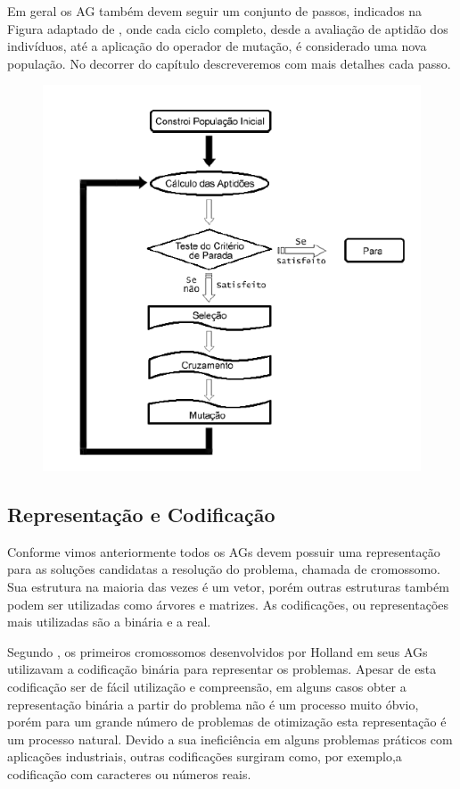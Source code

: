 	

Em geral os AG também devem seguir um conjunto de passos, indicados na Figura adaptado de \cite{kondageski08}, onde cada ciclo completo, desde a avaliação de aptidão dos indivíduos, até a aplicação do operador de mutação, é considerado uma nova população. No decorrer do capítulo descreveremos com mais detalhes cada passo.

\begin{figure}[ht!]
	\centering
	\includegraphics[scale=0.8]{figuras/processo-evolutivo.PNG}
	\label{processo-evolutivo}
\end{figure}

\subsection{Representação e Codificação}
 
 
Conforme vimos anteriormente todos os AGs devem possuir uma representação para as soluções candidatas a resolução do problema, chamada de cromossomo. Sua estrutura na maioria das vezes é um vetor, porém outras estruturas também podem ser utilizadas como árvores e matrizes. As codificações, ou representações mais utilizadas são a binária e a real.



Segundo \cite{linden12}, os primeiros cromossomos desenvolvidos por Holland em seus AGs utilizavam a codificação binária para representar os problemas. Apesar de esta codificação ser de fácil utilização e compreensão, em alguns casos obter a representação binária a partir do problema não é um processo muito óbvio, porém para um grande número de problemas de otimização esta representação é um processo natural. Devido a sua ineficiência em alguns problemas práticos com aplicações industriais, outras codificações surgiram como, por exemplo,a codificação com caracteres ou números reais.


